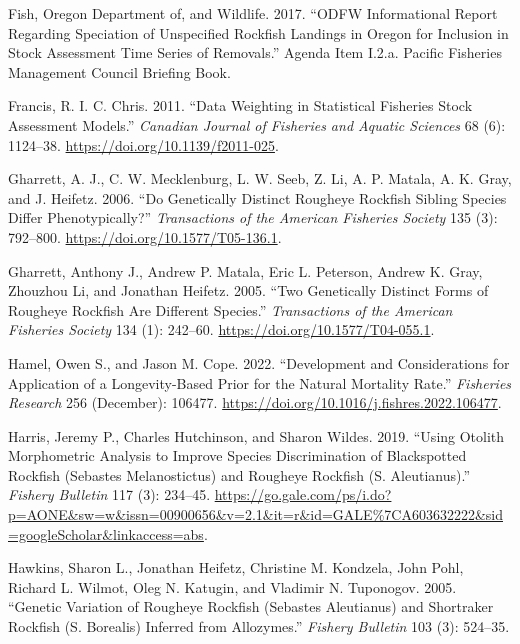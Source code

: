\documentclass[
]{scrartcl}
\newlength{\cslhangindent}
\newenvironment{CSLReferences}[2] %
 {\begin{list}{}{%
  \setlength{\itemindent}{0pt}
  \setlength{\leftmargin}{0pt}
  \setlength{\parsep}{0pt}
  \ifodd #1
   \setlength{\leftmargin}{\cslhangindent}
   \setlength{\itemindent}{-1\cslhangindent}
  \fi
  \setlength{\itemsep}{#2\baselineskip}}}
 {\end{list}}
\begin{document}
\begin{CSLReferences}{1}{0}
Fish, Oregon Department of, and Wildlife. 2017. {``ODFW Informational
Report Regarding Speciation of Unspecified Rockfish Landings in Oregon
for Inclusion in Stock Assessment Time Series of Removals.''} Agenda
Item I.2.a. Pacific Fisheries Management Council Briefing Book.

Francis, R. I. C. Chris. 2011. {``Data Weighting in Statistical
Fisheries Stock Assessment Models.''} \emph{Canadian Journal of
Fisheries and Aquatic Sciences} 68 (6): 1124--38.
\url{https://doi.org/10.1139/f2011-025}.

Gharrett, A. J., C. W. Mecklenburg, L. W. Seeb, Z. Li, A. P. Matala, A.
K. Gray, and J. Heifetz. 2006. {``Do {Genetically} {Distinct} {Rougheye}
{Rockfish} {Sibling} {Species} {Differ} {Phenotypically}?''}
\emph{Transactions of the American Fisheries Society} 135 (3): 792--800.
\url{https://doi.org/10.1577/T05-136.1}.

Gharrett, Anthony J., Andrew P. Matala, Eric L. Peterson, Andrew K.
Gray, Zhouzhou Li, and Jonathan Heifetz. 2005. {``Two {Genetically}
{Distinct} {Forms} of {Rougheye} {Rockfish} {Are} {Different}
{Species}.''} \emph{Transactions of the American Fisheries Society} 134
(1): 242--60. \url{https://doi.org/10.1577/T04-055.1}.

Hamel, Owen S., and Jason M. Cope. 2022. {``Development and
Considerations for Application of a Longevity-Based Prior for the
Natural Mortality Rate.''} \emph{Fisheries Research} 256 (December):
106477. \url{https://doi.org/10.1016/j.fishres.2022.106477}.

Harris, Jeremy P., Charles Hutchinson, and Sharon Wildes. 2019. {``Using
Otolith Morphometric Analysis to Improve Species Discrimination of
Blackspotted Rockfish ({Sebastes} Melanostictus) and Rougheye Rockfish
({S}. Aleutianus).''} \emph{Fishery Bulletin} 117 (3): 234--45.
\url{https://go.gale.com/ps/i.do?p=AONE&sw=w&issn=00900656&v=2.1&it=r&id=GALE\%7CA603632222&sid=googleScholar&linkaccess=abs}.

Hawkins, Sharon L., Jonathan Heifetz, Christine M. Kondzela, John Pohl,
Richard L. Wilmot, Oleg N. Katugin, and Vladimir N. Tuponogov. 2005.
{``Genetic Variation of Rougheye Rockfish ({Sebastes} Aleutianus) and
Shortraker Rockfish ({S}. Borealis) Inferred from Allozymes.''}
\emph{Fishery Bulletin} 103 (3): 524--35.


\end{CSLReferences}
\end{document}
